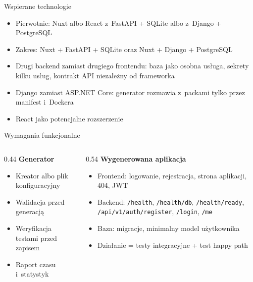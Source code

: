 \documentclass[aspectratio=169, 11pt]{beamer}
\begin{document}
\begin{frame}{Wspierane technologie}
  \begin{itemize}
    \item Pierwotnie: Nuxt albo React z~FastAPI + SQLite albo z~Django + PostgreSQL
    \item Zakres: Nuxt + FastAPI + SQLite oraz Nuxt + Django + PostgreSQL
    \item Drugi backend zamiast drugiego frontendu: baza jako osobna usługa, sekrety kilku usług, kontrakt API niezależny od frameworka
    \item Django zamiast ASP.NET Core: generator rozmawia z~packami tylko przez manifest i~Dockera
    \item React jako potencjalne rozszerzenie
  \end{itemize}
\end{frame}

\begin{frame}{Wymagania funkcjonalne}
  \begin{columns}[T]
    \begin{column}{0.44\textwidth}
      \textbf{Generator}
      {\small
      \begin{itemize}
        \item Kreator albo plik konfiguracyjny
        \item Walidacja przed generacją
        \item Weryfikacja testami przed zapisem
        \item Raport czasu i~statystyk
      \end{itemize}
      }
    \end{column}
    \begin{column}{0.54\textwidth}
      \textbf{Wygenerowana aplikacja}
      {\small
      \begin{itemize}
        \item Frontend: logowanie, rejestracja, strona aplikacji, 404, JWT
        \item Backend: \texttt{/health}, \texttt{/health/db}, \texttt{/health/ready}, \texttt{/api/v1/auth/register}, \texttt{/login}, \texttt{/me}
        \item Baza: migracje, minimalny model użytkownika
        \item Działanie = testy integracyjne + test happy path
      \end{itemize}
      }
    \end{column}
  \end{columns}
\end{frame}
\end{document}
